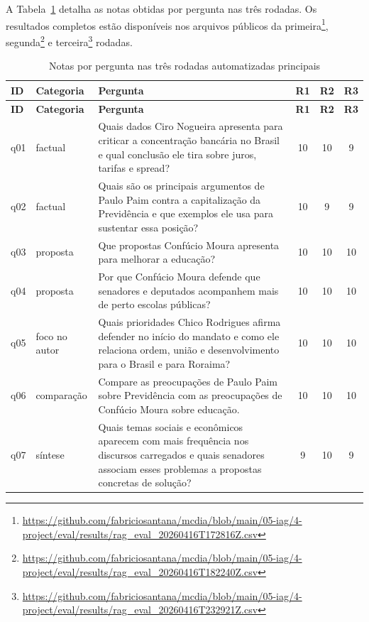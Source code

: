 A Tabela~\ref{tab:resultado-final-20} detalha as notas obtidas por pergunta nas três rodadas. Os resultados completos estão disponíveis nos arquivos públicos da primeira\footnote{\url{https://github.com/fabriciosantana/mcdia/blob/main/05-iag/4-project/eval/results/rag_eval_20260416T172816Z.csv}}, segunda\footnote{\url{https://github.com/fabriciosantana/mcdia/blob/main/05-iag/4-project/eval/results/rag_eval_20260416T182240Z.csv}} e terceira\footnote{\url{https://github.com/fabriciosantana/mcdia/blob/main/05-iag/4-project/eval/results/rag_eval_20260416T232921Z.csv}} rodadas.

\begingroup
\footnotesize
\setlength{\LTpre}{0pt}
\setlength{\LTpost}{0pt}
\begin{longtable}{@{}p{}>{\raggedright\arraybackslash}p{}>{\raggedright\arraybackslash}p{}ccc@{}}
\caption{Notas por pergunta nas três rodadas automatizadas principais}\label{tab:resultado-final-20}\\
\textbf{ID} & \textbf{Categoria} & \textbf{Pergunta} & \textbf{R1} & \textbf{R2} & \textbf{R3} \\
\hline
\endfirsthead
\textbf{ID} & \textbf{Categoria} & \textbf{Pergunta} & \textbf{R1} & \textbf{R2} & \textbf{R3} \\
\hline
\endhead
q01 & factual & Quais dados Ciro Nogueira apresenta para criticar a concentração bancária no Brasil e qual conclusão ele tira sobre juros, tarifas e spread? & 10 & 10 & 9 \\
q02 & factual & Quais são os principais argumentos de Paulo Paim contra a capitalização da Previdência e que exemplos ele usa para sustentar essa posição? & 10 & 9 & 9 \\
q03 & proposta & Que propostas Confúcio Moura apresenta para melhorar a educação? & 10 & 10 & 10 \\
q04 & proposta & Por que Confúcio Moura defende que senadores e deputados acompanhem mais de perto escolas públicas? & 10 & 10 & 10 \\
q05 & foco no autor & Quais prioridades Chico Rodrigues afirma defender no início do mandato e como ele relaciona ordem, união e desenvolvimento para o Brasil e para Roraima? & 10 & 10 & 10 \\
q06 & comparação & Compare as preocupações de Paulo Paim sobre Previdência com as preocupações de Confúcio Moura sobre educação. & 10 & 10 & 10 \\
q07 & síntese & Quais temas sociais e econômicos aparecem com mais frequência nos discursos carregados e quais senadores associam esses problemas a propostas concretas de solução? & 9 & 10 & 9 \\

\end{longtable}
